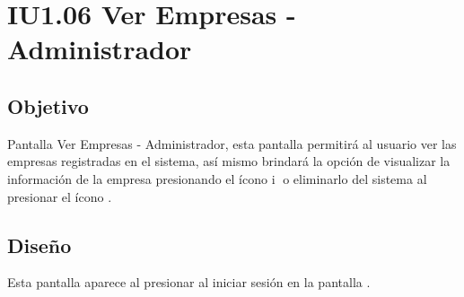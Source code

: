 \newpage
\section{IU1.06 Ver Empresas - Administrador}

\subsection{Objetivo}
	Pantalla Ver Empresas - Administrador, esta pantalla permitirá al usuario  ver las empresas registradas en el sistema, así mismo brindará la opción de visualizar la información de la empresa presionando el ícono \textcircled{i} o eliminarlo del sistema al presionar el ícono \faTrashO.
	


\subsection{Diseño}
    Esta pantalla aparece al presionar al iniciar sesión en la pantalla .

	
